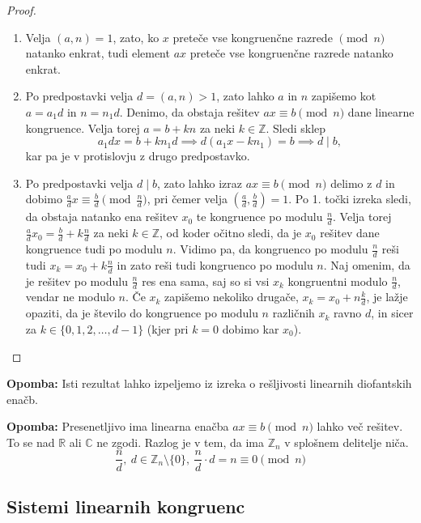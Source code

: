 \documentclass[12pt, a4paper]{article}
\newenvironment{opom}[1][]{\par\medskip\noindent \textbf{Opomba: }}{\medskip}
\begin{document}
\begin{proof}
\begin{enumerate}
\item Velja $(a,n)=1$, zato, ko $x$ preteče vse kongruenčne razrede $\pmod n$ natanko enkrat, tudi element $ax$ preteče vse kongruenčne razrede natanko enkrat.
\item Po predpostavki velja $d=(a,n)>1$, zato lahko $a$ in $n$ zapišemo kot $a=a_{1}d$ in $n=n_{1}d$. Denimo, da obstaja rešitev $ax\equiv b\pmod n$ dane linearne kongruence. Velja torej $a=b + kn$ za neki $k\in \mathbb{Z}$. Sledi sklep
$$a_{1}dx=b+kn_{1}d \implies d(a_{1}x-kn_{1})=b\implies d\mid b,$$
kar pa je v protislovju z drugo predpostavko.
\item Po predpostavki velja $d\mid b$, zato lahko izraz $ax\equiv b \pmod n$ delimo z $d$ in dobimo $\frac{a}{d}x\equiv \frac{b}{d} \pmod{\frac{n}{d}}$, pri čemer velja $(\frac{a}{d}, \frac{b}{d})=1$. Po 1. točki izreka sledi, da obstaja natanko ena rešitev $x_{0}$ te kongruence po modulu $\frac{n}{d}$. Velja torej $\frac{a}{d}x_{0}= \frac{b}{d} +k\frac{n}{d}$ za neki $k\in \mathbb{Z}$, od koder očitno sledi, da je $x_{0}$ rešitev dane kongruence tudi po modulu $n$. Vidimo pa, da kongruenco po modulu $\frac{n}{d}$ reši tudi $x_{k}=x_{0}+k\frac{n}{d}$ in zato reši tudi kongruenco po modulu $n$. Naj omenim, da je rešitev po modulu ${\frac{n}{d}}$ res ena sama, saj so si vsi $x_{k}$ kongruentni modulo $\frac{n}{d}$, vendar ne modulo $n$. Če $x_{k}$ zapišemo nekoliko drugače, $x_{k}=x_{0}+n\frac{k}{d}$, je lažje opaziti, da je število do kongruence po modulu $n$ različnih $x_{k}$ ravno $d$, in sicer za $k\in \{0,1,2,\ldots,d-1\}$ (kjer pri $k=0$ dobimo kar $x_{0}$).
\end{enumerate}
\end{proof}

\begin{opom}
Isti rezultat lahko izpeljemo iz izreka o rešljivosti linearnih diofantskih enačb.
\end{opom}

\begin{opom}
Presenetljivo ima linearna enačba $ax\equiv b\pmod n$ lahko več rešitev. To se nad $\mathbb{R}$ ali $\mathbb{C}$ ne zgodi. Razlog je v tem, da ima $\mathbb{Z}_{n}$ v splošnem delitelje niča.
$$\frac{n}{d},\ d\in \mathbb{Z}_{n}\setminus\{0\},\ \frac{n}{d}\cdot d = n \equiv 0 \pmod n$$
\end{opom}

\subsection{Sistemi linearnih kongruenc}
 
\end{document}
